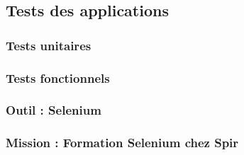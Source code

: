 \subsection{Tests des applications}

\subsubsection{Tests unitaires}

\subsubsection{Tests fonctionnels}

\subsubsection{Outil : Selenium}

\subsubsection{Mission : Formation Selenium chez Spir}

